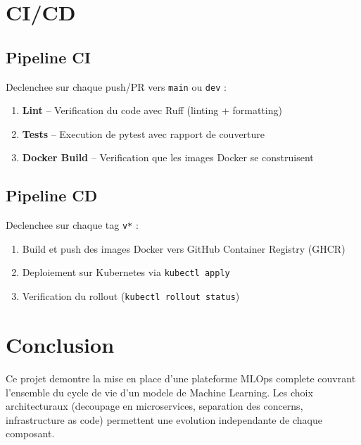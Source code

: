 \documentclass[a4paper,11pt]{article}
\begin{document}
\section{CI/CD}

\subsection{Pipeline CI}

Declenchee sur chaque push/PR vers \texttt{main} ou \texttt{dev} :
\begin{enumerate}
    \item \textbf{Lint} -- Verification du code avec Ruff (linting + formatting)
    \item \textbf{Tests} -- Execution de pytest avec rapport de couverture
    \item \textbf{Docker Build} -- Verification que les images Docker se construisent
\end{enumerate}

\subsection{Pipeline CD}

Declenchee sur chaque tag \texttt{v*} :
\begin{enumerate}
    \item Build et push des images Docker vers GitHub Container Registry (GHCR)
    \item Deploiement sur Kubernetes via \texttt{kubectl apply}
    \item Verification du rollout (\texttt{kubectl rollout status})
\end{enumerate}

\section{Conclusion}

Ce projet demontre la mise en place d'une plateforme MLOps complete couvrant
l'ensemble du cycle de vie d'un modele de Machine Learning. Les choix
architecturaux (decoupage en microservices, separation des concerns, infrastructure
as code) permettent une evolution independante de chaque composant.
\end{document}
